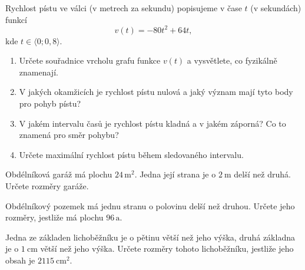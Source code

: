 \documentclass[12pt,a4paper]{article}
\begin{document}
\begin{exercise}
Rychlost pístu ve válci (v metrech za sekundu) popisujeme v čase \(t\) (v sekundách) funkcí
\[
v(t) = -80t^2 + 64t,
\]
kde \(t \in \langle 0; 0{,}8 \rangle\).

\begin{enumerate}[label=\alph*)]
  \item Určete souřadnice vrcholu grafu funkce \(v(t)\) a vysvětlete, co fyzikálně znamenají.
  \item V jakých okamžicích je rychlost pístu nulová a jaký význam mají tyto body pro pohyb pístu?
  \item V jakém intervalu časů je rychlost pístu kladná a v jakém záporná? Co to znamená pro směr pohybu?
  \item Určete maximální rychlost pístu během sledovaného intervalu.
\end{enumerate}

\end{exercise}

\setcounter{section}{2}
\begin{exercise}
Obdélníková garáž má plochu \(24\,\text{m}^2\).  
Jedna její strana je o \(2\ \text{m}\) delší než druhá.  
Určete rozměry garáže.

\end{exercise}


\begin{exercise}
Obdélníkový pozemek má jednu stranu o polovinu delší než druhou.  
Určete jeho rozměry, jestliže má plochu \(96\,\text{a}\).

\end{exercise}


\begin{exercise}
Jedna ze základen lichoběžníku je o pětinu větší než jeho výška,  
druhá základna je o \(1\ \text{cm}\) větší než jeho výška.  
Určete rozměry tohoto lichoběžníku, jestliže jeho obsah je
$2115\ \text{cm}^2.$

\end{exercise}
\end{document}
